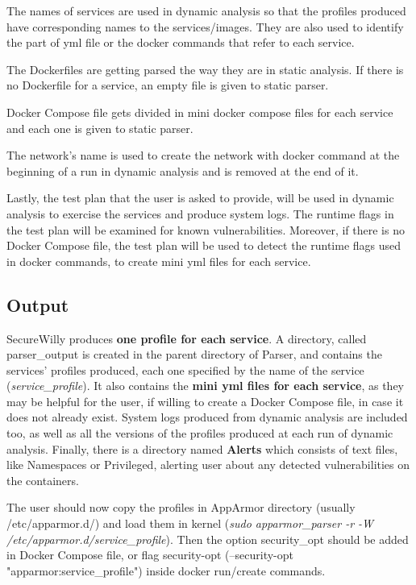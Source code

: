 The names of services are used in dynamic analysis so that the profiles produced have corresponding names to the services/images. They are also used to identify the part of yml file or the docker commands that refer to each service. 

The Dockerfiles are getting parsed the way they are in static analysis. If there is no Dockerfile for a service, an empty file is given to static parser.

Docker Compose file gets divided in mini docker compose files for each service and each one is given to static parser.

The network's name is used to create the network with docker command at the beginning of a run in dynamic analysis and is removed at the end of it.

Lastly, the test plan that the user is asked to provide, will be used in dynamic analysis to exercise the services and produce system logs. The runtime flags in the test plan will be examined for known vulnerabilities. Moreover, if there is no Docker Compose file, the test plan will be used to detect the runtime flags used in docker commands, to create mini yml files for each service.

\subsection{Output}
SecureWilly produces \textbf{one profile for each service}. A directory, called parser\_output is created in the parent directory of Parser, and contains the services' profiles produced, each one specified by the name of the service (\textit{service\_profile}). It also contains the \textbf{mini yml files for each service}, as they may be helpful for the user, if willing to create a Docker Compose file, in case it does not already exist. System logs produced from dynamic analysis are included too, as well as all the versions of the profiles produced at each run of dynamic analysis. Finally, there is a directory named \textbf{Alerts} which consists of text files, like Namespaces or Privileged, alerting user about any detected vulnerabilities on the containers.

The user should now copy the profiles in AppArmor directory (usually /etc/apparmor.d/) and load them in kernel (\textit{sudo apparmor\_parser -r -W /etc/apparmor.d/service\_profile}). Then the option security\_opt should be added in Docker Compose file, or flag security-opt (--security-opt "apparmor:service\_profile") inside docker run/create commands.

